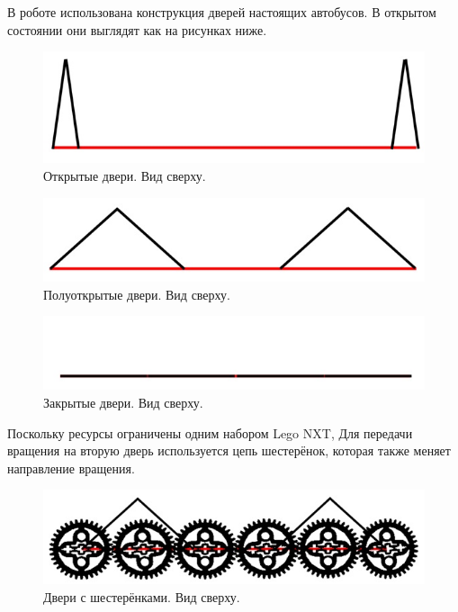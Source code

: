 В роботе использована конструкция дверей настоящих автобусов. В открытом состоянии они выглядят как на рисунках ниже.

\begin{figure}[h!]
	\begin{center}
		\includegraphics[width=0.9\linewidth]{chapters/chapter26/images/2}
		\caption{Открытые двери. Вид сверху.}
		\label{ris:image26x2}
	\end{center}
\end{figure}


\begin{figure}[h!]
	\begin{center}
		\includegraphics[width=0.88\linewidth]{chapters/chapter26/images/3}
		\caption{Полуоткрытые двери. Вид сверху.}
		\label{ris:image26x3}
	\end{center}
\end{figure}

\begin{figure}[h!]
	\begin{center}
		\includegraphics[width=0.88\linewidth]{chapters/chapter26/images/4}
		\caption{Закрытые двери. Вид сверху.}
		\label{ris:image26x4}
	\end{center}
\end{figure}	

Поскольку ресурсы ограничены одним набором Lego NXT, Для передачи вращения на вторую дверь используется цепь шестерёнок, которая также меняет направление вращения.

\begin{figure}[h!]
	\begin{center}
		\includegraphics[width=0.88\linewidth]{chapters/chapter26/images/5}
		\caption{Двери с шестерёнками. Вид сверху.}
		\label{ris:image26x5}
	\end{center}
\end{figure}	

